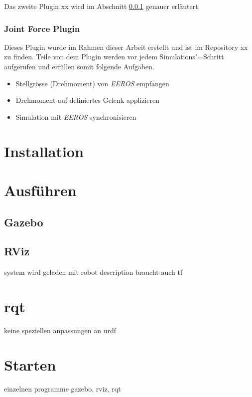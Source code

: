 Das zweite Plugin xx wird im Abschnitt \ref{chap:joint-force-plugin} genauer erläutert.

\subsubsection{Joint Force Plugin}
\label{chap:joint-force-plugin}
Dieses Plugin wurde im Rahmen dieser Arbeit erstellt und ist im Repository xx zu finden.
Teile von dem Plugin werden vor jedem Simulations"=Schritt aufgerufen und erfüllen somit folgende Aufgaben.
\begin{itemize}
\item Stellgrösse (Drehmoment) von \textit{EEROS} empfangen
\item Drehmoment auf definiertes Gelenk applizieren
\item Simulation mit \textit{EEROS} synchronisieren
\end{itemize}

\section{Installation}


\section{Ausführen}
\subsection{Gazebo}

\subsection{RViz}
system wird geladen mit robot description
braucht auch tf

\section{rqt}
keine speziellen anpassungen an urdf 

\section{Starten}
einzelnen programme gazebo, rviz, rqt


